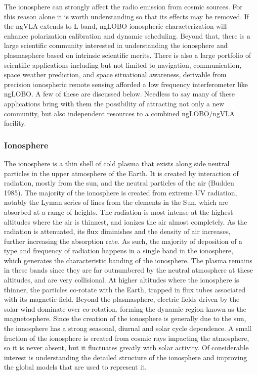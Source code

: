 \documentclass[11pt]{article}
\begin{document}
The ionosphere can strongly affect the radio emission from cosmic sources.  For this reason alone it is worth understanding so that its effects may be removed.  If the ngVLA extends to L band, ngLOBO ionospheric characterization will enhance polarization calibration and dynamic scheduling. Beyond that, there is a large scientific community interested in understanding the ionosphere and plasmasphere based on intrinsic scientific merits. There is also a large portfolio of scientific applications including but not limited to navigation, communication, space weather prediction, and space situational awareness, derivable from precision ionospheric remote sensing afforded a low frequency interferometer like ngLOBO.  A few of these are discussed below. Needless to say many of these applications bring with them the possibility of attracting not only a new community, but also independent resources to a combined ngLOBO/ngVLA facility.

\subsubsection{Ionosphere} The ionosphere is a thin shell of cold plasma that exists along side neutral particles in the upper atmosphere of the Earth. It is created by interaction of radiation, mostly from the sun, and the neutral particles of the air (Budden 1985). The majority of the ionosphere is created from extreme UV radiation, notably the Lyman series of lines from the elements in the Sun, which are absorbed at a range of heights. The radiation is most intense at the highest altitudes where the air is thinnest, and ionizes the air almost completely. As the radiation is attenuated, its flux diminishes and the density of air increases, further increasing the absorption rate. As such, the majority of deposition of a type and frequency of radiation happens in a single band in the ionosphere, which generates the characteristic banding of the ionosphere. The plasma remains in these bands since they are far outnumbered by the neutral atmosphere at these altitudes, and are very collisional. At higher altitudes where the ionosphere is thinner, the particles co-rotate with the Earth, trapped in flux tubes associated with its magnetic field. Beyond the plasmasphere, electric fields driven by the solar wind dominate over co-rotation, forming the dynamic region known as the magnetosphere.  Since the creation of the ionosphere is generally due to the sun, the ionosphere has a strong seasonal, diurnal and solar cycle dependence. A small fraction of the ionosphere is created from cosmic rays impacting the atmosphere, so it is never absent, but it fluctuates greatly with solar activity.  Of considerable interest is  understanding the  detailed structure of the ionosphere and improving the global models that are used to represent it.
\end{document}
